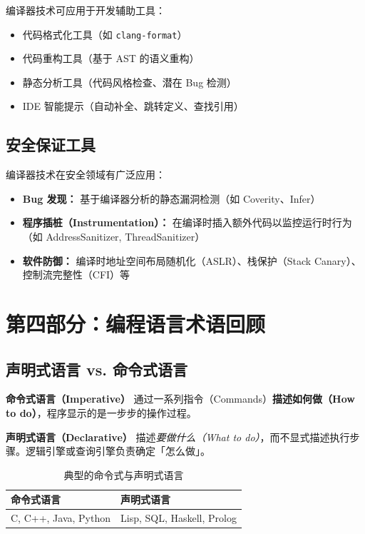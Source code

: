 \documentclass[12pt,a4paper]{ctexart}
\newcommand{\term}[1]{\textbf{\textcolor{mainblue}{#1}}}
\begin{document}
编译器技术可应用于开发辅助工具：
\begin{itemize}[itemsep=0.2em]
  \item 代码格式化工具（如 \texttt{clang-format}）
  \item 代码重构工具（基于 AST 的语义重构）
  \item 静态分析工具（代码风格检查、潜在 Bug 检测）
  \item IDE 智能提示（自动补全、跳转定义、查找引用）
\end{itemize}

\subsection{安全保证工具}

编译器技术在安全领域有广泛应用：
\begin{itemize}[itemsep=0.2em]
  \item \textbf{Bug 发现：} 基于编译器分析的静态漏洞检测（如 Coverity、Infer）
  \item \textbf{程序插桩（Instrumentation）：} 在编译时插入额外代码以监控运行时行为（如 AddressSanitizer, ThreadSanitizer）
  \item \textbf{软件防御：} 编译时地址空间布局随机化（ASLR）、栈保护（Stack Canary）、控制流完整性（CFI）等
\end{itemize}

\newpage

\section{第四部分：编程语言术语回顾}

\subsection{声明式语言 vs. 命令式语言}

\begin{keybox}
  \term{命令式语言（Imperative）} 通过一系列指令（Commands）\textbf{描述如何做（How to do）}，程序显示的是一步步的操作过程。

  \term{声明式语言（Declarative）} 描述\emph{要做什么（What to do）}，而不显式描述执行步骤。逻辑引擎或查询引擎负责确定「怎么做」。
\end{keybox}

\begin{table}[h]
\centering
\begin{tabular}{@{}ll@{}}
\toprule
\textbf{命令式语言} & \textbf{声明式语言} \\
\midrule
C, C++, Java, Python & Lisp, SQL, Haskell, Prolog \\
\bottomrule
\end{tabular}
\caption{典型的命令式与声明式语言}
\end{table}
\end{document}
